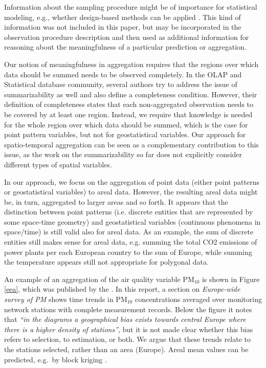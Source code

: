 \documentclass[final,authoryear,1p,times]{elsarticle}
\begin{document}
Information about the sampling procedure might be of importance for statistical modeling, e.g., whether design-based methods can be applied \citep{Gruijter2006}. This kind of information was not included in this paper, but may be incorporated in the observation procedure description and then used as additional information for reasoning about the meaningfulness of a particular prediction or aggregation.

Our notion of meaningfulness in aggregation requires that the regions over which data should be summed needs to be observed completely. In the OLAP and Statistical database community, several authors try to address the issue of summarizability as well \citep{Lenz1997,Mazon2009,Niemi2010} and also define a completeness condition. However, their definition of completeness states that each non-aggregated observation needs to be covered by at least one region. Instead, we require that knowledge is needed for the whole region over which data should be summed, which is the case for point pattern variables, but not for geostatistical variables. Our approach for spatio-temporal aggregation can be seen as a complementary contribution to this issue, as the work on the summarizability so far does not explicitly consider different types of spatial variables. 

In our approach, we focus on the aggregation of point data (either point patterns or geostatistical variables) to areal data. However, the resulting areal data might be, in turn, aggregated to larger areas and so forth. It appears that the distinction between point patterns (i.e. discrete entities that are represented by some space-time geometry) and geostatistical variables (continuous phenomena in space/time) is still valid also for areal data. As an example, the sum of discrete entities still makes sense for areal data, e.g. summing the total CO2 emissions of power plants per each European country to the sum of Europe, while summing the temperature appears still not appropriate for polygonal data.

An example of an aggregation of the air quality variable PM$_{10}$ is shown in Figure \ref{eea}, which was published by the \cite{eea}. In this report, a section on {\em Europe-wide survey of PM} shows time trends in PM$_{10}$ concentrations averaged over monitoring network stations with complete measurement records. Below the figure it notes that {\em ``in the diagrams a geographical bias exists towards central Europe where there is a higher density of stations''}, but it is not made clear whether this bias refers to selection, to estimation, or both. We argue that these trends relate to the stations selected, rather than an area (Europe). Areal mean values can be predicted, e.g.~by block kriging \citep{Journel1978}. 
\end{document}
